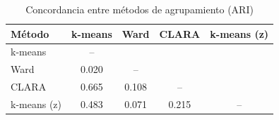 \begin{table}[!htb]
\centering
\caption{Concordancia entre métodos de agrupamiento (ARI)}
\label{tab:ari}
\footnotesize
\begin{tabular}{@{}lcccc@{}}
\toprule
Método & k-means & Ward & CLARA & k-means (z) \\
\midrule
k-means & -- &  &  &  \\
Ward & 0.020 & -- &  &  \\
CLARA & 0.665 & 0.108 & -- &  \\
k-means (z) & 0.483 & 0.071 & 0.215 & -- \\
\bottomrule
\end{tabular}
\end{table}
